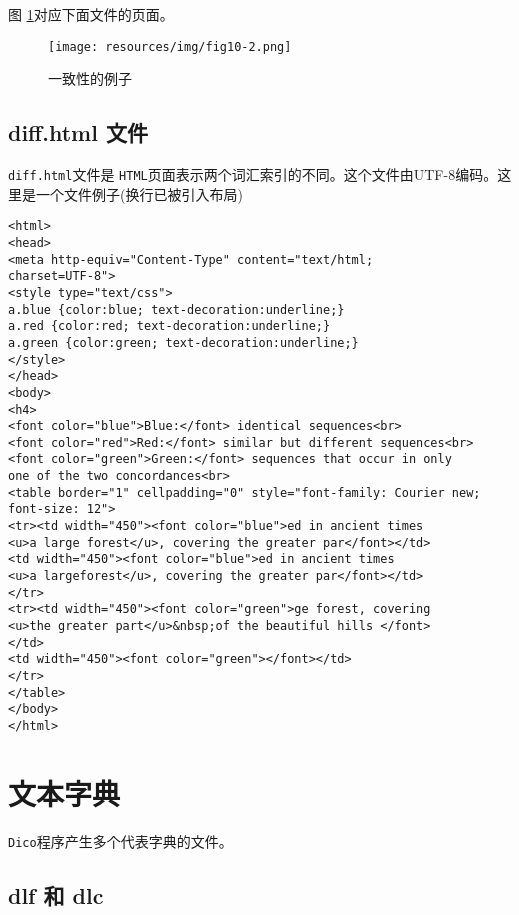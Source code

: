 \bigskip
\noindent 图 \ref{fig-example-concordance-2}对应下面文件的页面。

\begin{figure}[!h]
\begin{center}
\texttt{[image: resources/img/fig10-2.png]}
\caption{一致性的例子 \label{fig-example-concordance-2}}
\end{center}
\end{figure}



\subsection{diff.html 文件}
\verb+diff.html+文件是 \verb+HTML+页面表示两个词汇索引的不同。这个文件由UTF-8编码。这里是一个文件例子(换行已被引入布局)



\begin{verbatim}
<html>
<head>
<meta http-equiv="Content-Type" content="text/html;
charset=UTF-8">
<style type="text/css">
a.blue {color:blue; text-decoration:underline;}
a.red {color:red; text-decoration:underline;}
a.green {color:green; text-decoration:underline;}
</style>
</head>
<body>
<h4>
<font color="blue">Blue:</font> identical sequences<br>
<font color="red">Red:</font> similar but different sequences<br>
<font color="green">Green:</font> sequences that occur in only
one of the two concordances<br>
<table border="1" cellpadding="0" style="font-family: Courier new;
font-size: 12">
<tr><td width="450"><font color="blue">ed in ancient times
<u>a large forest</u>, covering the greater par</font></td>
<td width="450"><font color="blue">ed in ancient times
<u>a largeforest</u>, covering the greater par</font></td>
</tr>
<tr><td width="450"><font color="green">ge forest, covering
<u>the greater part</u>&nbsp;of the beautiful hills </font>
</td>
<td width="450"><font color="green"></font></td>
</tr>
</table>
</body>
</html>
\end{verbatim}


\section{文本字典}
\verb+Dico+程序产生多个代表字典的文件。


\subsection{dlf 和 dlc}

